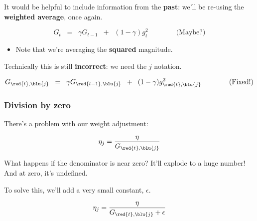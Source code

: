             It would be helpful to include information from the \textbf{past}: we'll be re-using the \textbf{weighted average}, once again.

            \begin{equation*}
                G_t \;\;=\;\; 
                \gamma G_{t-1} \;\;+\;\; 
                (1-\gamma) g_t^2 
                \qquad \qquad \text{(Maybe?)}
            \end{equation*}

            \begin{itemize}
                \item Note that we're averaging the \textbf{squared} magnitude.
            \end{itemize}
            
            Technically this is still \textbf{incorrect}: we need the $j$ notation.

            \begin{equation*}
                G_{\red{t},\blu{j}} \;\;=\;\; 
                \gamma G_{\red{t-1},\blu{j}} \;\;+\;\; 
                (1-\gamma) g_{\red{t},\blu{j}}^2 \qquad \qquad 
                \text{(Fixed!)}
            \end{equation*}

        \subsubsection{Division by zero}

            There's a problem with our weight adjustment:

            \begin{equation}
                \eta_j = \frac{\eta}{G_{\red{t},\blu{j}}}
            \end{equation}

            What happens if the denominator is near zero? It'll explode to a huge number! And at zero, it's undefined.

            To solve this, we'll add a very small constant, $\epsilon$.

                \begin{equation}
                    \eta_j = \frac{\eta}{G_{\red{t},\blu{j}}+\epsilon}
                \end{equation}

